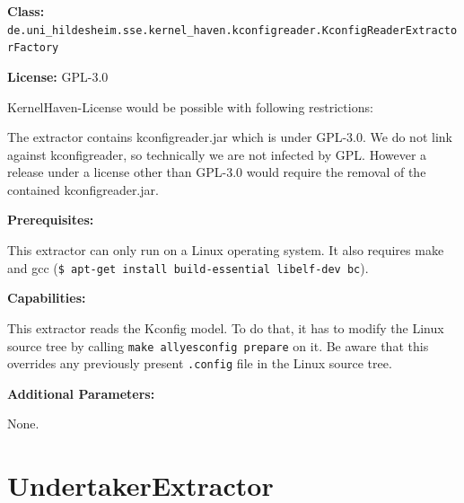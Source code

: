 \textbf{Class:} \texttt{de.uni\_hildesheim.sse.kernel\_haven.kconfigreader.KconfigReaderExtractorFactory}


\textbf{License:} GPL-3.0 

KernelHaven-License would be possible with following restrictions:

The extractor contains kconfigreader.jar which is under GPL-3.0. We do not link against kconfigreader, so technically we are not infected by GPL. However a release under a license other than GPL-3.0 would require the removal of the contained kconfigreader.jar.

\textbf{Prerequisites:}

This extractor can only run on a Linux operating system. It also requires make and gcc (\texttt{\$ apt-get install  build-essential libelf-dev bc}).

\textbf{Capabilities:}

This extractor reads the Kconfig model. To do that, it has to modify the Linux source tree by calling \texttt{make allyesconfig prepare} on it. Be aware that this overrides any previously present \texttt{.config} file in the Linux source tree.

\textbf{Additional Parameters:}

None.

%        


\section{UndertakerExtractor}

